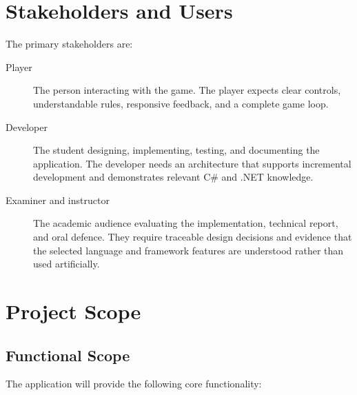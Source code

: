 \section{Stakeholders and Users}

The primary stakeholders are:

\begin{description}
	\item[Player] The person interacting with the game. The player expects clear controls, understandable rules, responsive feedback, and a complete game loop.

	\item[Developer] The student designing, implementing, testing, and documenting the application. The developer needs an architecture that supports incremental development and demonstrates relevant C\# and .NET knowledge.

	\item[Examiner and instructor] The academic audience evaluating the implementation, technical report, and oral defence. They require traceable design decisions and evidence that the selected language and framework features are understood rather than used artificially.
\end{description}

\section{Project Scope}

\subsection{Functional Scope}

The application will provide the following core functionality:

